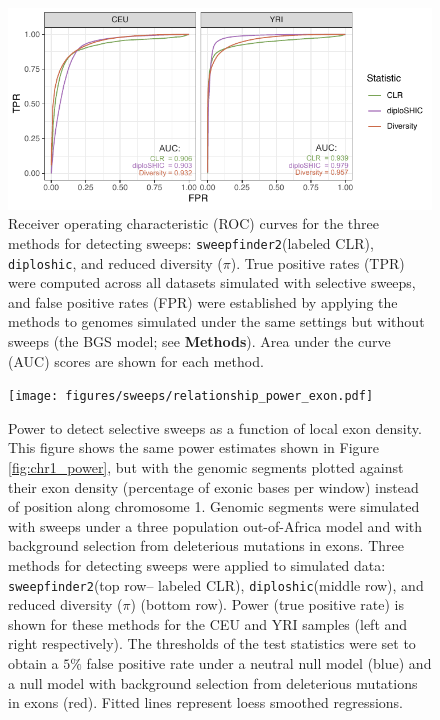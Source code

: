 \documentclass[hidelinks]{article}
\newcommand{\sweepfinder}{\texttt{sweepfinder2}\xspace}
\newcommand{\diploshic}{\texttt{diploshic}\xspace}
\begin{document}
\begin{figure}[h]
    \centering
    \includegraphics[width=0.8 \textwidth]{figures/sweeps/roc_neutral_null.pdf}
    \caption{
    \label{fig:roc-curves}
    Receiver operating characteristic (ROC) curves for the three methods for detecting sweeps:
    \sweepfinder (labeled CLR), \diploshic, and reduced diversity ($\pi$).
    True positive rates (TPR) were computed across all datasets simulated with selective sweeps,
    and false positive rates (FPR) were established by applying the methods to genomes simulated
    under the same settings but without sweeps (the BGS model; see \textbf{Methods}).
    Area under the curve (AUC) scores are shown for each method.
    }
\end{figure}


\begin{figure}[h]
    \centering
    \texttt{[image: figures/sweeps/relationship\_power\_exon.pdf]}
    \caption{
        Power to detect selective sweeps
        as a function of local exon density.
        This figure shows the same power estimates shown in Figure \ref{fig:chr1_power},
        but with the genomic segments plotted against their
        exon density (percentage of exonic bases per window) instead of position along chromosome 1.
    	Genomic segments were simulated with sweeps under a three population out-of-Africa model
        and with background selection from deleterious mutations in exons.
        Three methods for detecting sweeps were applied to simulated data:
        \sweepfinder (top row-- labeled CLR),
        \diploshic (middle row),
        and reduced diversity ($\pi$) (bottom row).
        Power (true positive rate) is shown for these methods for the CEU and YRI
        samples (left and right respectively).
        The thresholds of the test statistics were set to obtain a
        $5\%$ false positive rate under a neutral null model (blue)
        and a null model with background selection from deleterious mutations in exons (red).
        Fitted lines represent loess smoothed regressions.
    }
    \label{fig:power-exon}
\end{figure}
\end{document}
